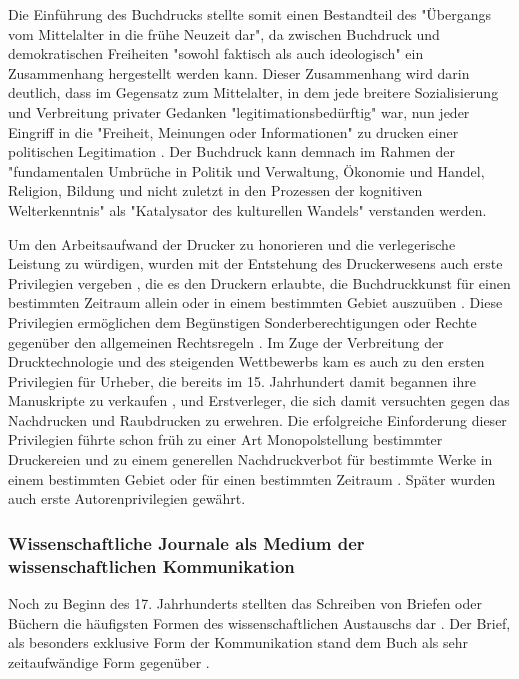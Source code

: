 Die Einführung des Buchdrucks stellte somit einen Bestandteil des "Übergangs vom Mittelalter in die frühe Neuzeit dar"\cite{lange2008medienwettbewerb}, da zwischen Buchdruck und demokratischen Freiheiten "sowohl faktisch als auch ideologisch" \cite{suchen} ein Zusammenhang hergestellt werden kann. Dieser Zusammenhang wird darin deutlich, dass im Gegensatz zum Mittelalter, in dem jede breitere Sozialisierung und Verbreitung privater Gedanken "legitimationsbedürftig" war, nun jeder Eingriff in die "Freiheit, Meinungen oder Informationen" zu drucken einer politischen Legitimation \cite{giesecke_1991_buchdruck}. Der Buchdruck kann demnach im Rahmen der "fundamentalen Umbrüche in Politik und Verwaltung, Ökonomie und Handel, Religion, Bildung und nicht zuletzt in den Prozessen der kognitiven Welterkenntnis" \cite{pscheida_2010_wikipedia} als "Katalysator des kulturellen Wandels"\cite{giesecke_1991_buchdruck} verstanden werden.

Um den Arbeitsaufwand der Drucker zu honorieren und die verlegerische Leistung zu würdigen\cite{szilagyi_2011_leistungsschutzrecht}, wurden mit der Entstehung des Druckerwesens auch erste Privilegien vergeben \cite{gieseke_1995_privileg}, die es den Druckern erlaubte, die Buchdruckkunst für einen bestimmten Zeitraum allein oder in einem bestimmten Gebiet auszuüben \cite{martin2008publizistische} \cite{koller_1995_Urheberrecht}. Diese Privilegien ermöglichen dem Begünstigen Sonderberechtigungen oder Rechte gegenüber den allgemeinen Rechtsregeln \cite{jaenich_2002_geistiges}. Im Zuge der Verbreitung der Drucktechnologie und des steigenden Wettbewerbs kam es auch zu den ersten Privilegien für Urheber, die bereits im 15. Jahrhundert damit begannen ihre Manuskripte zu verkaufen \cite{hesse2002rise}, und Erstverleger, die sich damit versuchten gegen das Nachdrucken und Raubdrucken zu erwehren. Die erfolgreiche Einforderung dieser Privilegien führte schon früh zu einer Art Monopolstellung bestimmter Druckereien und zu einem generellen Nachdruckverbot für bestimmte Werke in einem bestimmten Gebiet oder für einen bestimmten Zeitraum \cite{szilagyi_2011_leistungsschutzrecht} \cite{hesse2002rise}. Später wurden auch erste Autorenprivilegien gewährt.

\subsubsection{Wissenschaftliche Journale als Medium der wissenschaftlichen Kommunikation}

Noch zu Beginn des 17. Jahrhunderts stellten das Schreiben von Briefen oder Büchern die häufigsten Formen des wissenschaftlichen Austauschs dar \cite{porter_1964_scientific}. Der Brief, als besonders exklusive Form der Kommunikation stand dem Buch als sehr zeitaufwändige Form gegenüber \cite{fecher_hiig_2014}.

